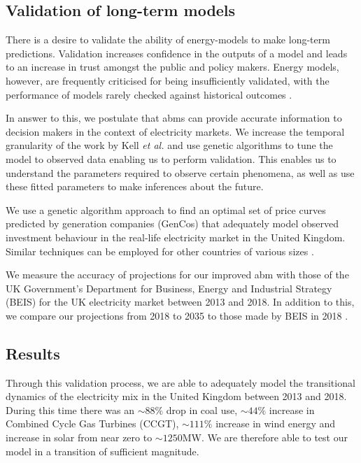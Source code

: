 \subsection{Validation of long-term models}

There is a desire to validate the ability of energy-models to make long-term predictions. Validation increases confidence in the outputs of a model and leads to an increase in trust amongst the public and policy makers. Energy models, however, are frequently criticised for being insufficiently validated, with the performance of models rarely checked against historical outcomes \cite{Beckman2011}.

In answer to this, we postulate that \acrshort{abm}s can provide accurate information to decision makers in the context of electricity markets. We increase the temporal granularity of the work by Kell \textit{et al.} \cite{Kell} and use genetic algorithms to tune the model to observed data enabling us to perform validation. This enables us to understand the parameters required to observe certain phenomena, as well as use these fitted parameters to make inferences about the future. 




We use a genetic algorithm approach to find an optimal set of price curves predicted by generation companies (GenCos) that adequately model observed investment behaviour in the real-life electricity market in the United Kingdom. Similar techniques can be employed for other countries of various sizes \cite{Kell}. 

We measure the accuracy of projections for our improved \acrshort{abm} with those of the UK Government's Department for Business, Energy and Industrial Strategy (BEIS) for the UK electricity market between 2013 and 2018. In addition to this, we compare our projections from 2018 to 2035 to those made by BEIS in 2018 \cite{DBEIS2019}.




\subsection{Results}

Through this validation process, we are able to adequately model the transitional dynamics of the electricity mix in the United Kingdom between 2013 and 2018. During this time there was an ${\sim}88\%$ drop in coal use, ${\sim}44\%$ increase in Combined Cycle Gas Turbines (CCGT), ${\sim}111\% $ increase in wind energy and increase in solar from near zero to ${\sim}1250$MW. We are therefore able to test our model in a transition of sufficient magnitude.

